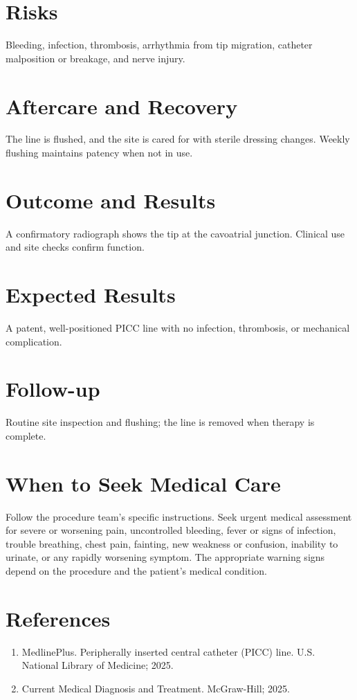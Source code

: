 \section*{Risks}
Bleeding, infection, thrombosis, arrhythmia from tip migration, catheter malposition or breakage, and nerve injury.

\section*{Aftercare and Recovery}
The line is flushed, and the site is cared for with sterile dressing changes. Weekly flushing maintains patency when not in use.

\section*{Outcome and Results}
A confirmatory radiograph shows the tip at the cavoatrial junction. Clinical use and site checks confirm function.

\section*{Expected Results}
A patent, well-positioned PICC line with no infection, thrombosis, or mechanical complication.

\section*{Follow-up}
Routine site inspection and flushing; the line is removed when therapy is complete.

\section*{When to Seek Medical Care}
Follow the procedure team's specific instructions. Seek urgent medical assessment for severe or worsening pain, uncontrolled bleeding, fever or signs of infection, trouble breathing, chest pain, fainting, new weakness or confusion, inability to urinate, or any rapidly worsening symptom. The appropriate warning signs depend on the procedure and the patient's medical condition.

\section*{References}
\begin{enumerate}
  \item MedlinePlus. Peripherally inserted central catheter (PICC) line. U.S. National Library of Medicine; 2025.
  \item Current Medical Diagnosis and Treatment. McGraw-Hill; 2025.
\end{enumerate}

\clearpage
